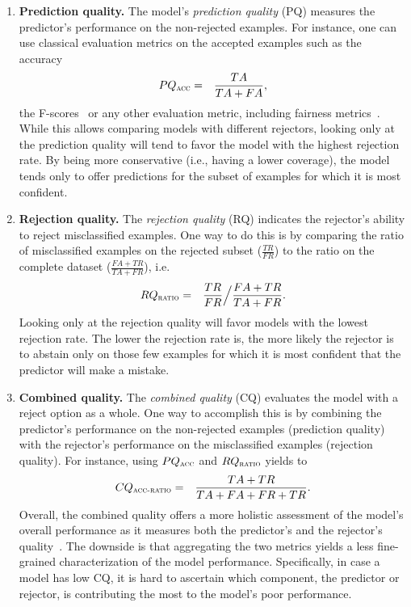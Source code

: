 \begin{enumerate}
%
\item[\textbf{a)}] \textbf{Prediction quality.} The model's \textit{prediction quality} (PQ) measures the predictor's performance on the non-rejected examples. For instance, one can use classical evaluation metrics on the accepted examples such as the accuracy
\begin{eqnarray*}
   PQ_{\textsc{acc}}&=& \frac{TA}{TA+FA},
\end{eqnarray*}
the F-scores~\citep{Pillai2011,Mesquita2016} or any other evaluation metric, including fairness metrics~\citep{Madras2018}.
While this allows comparing models with different rejectors, looking only at the prediction quality will tend to  favor the model with the highest rejection rate. By being more conservative (i.e., having a lower coverage), the model tends only to offer predictions for the subset of examples for which it is most confident. 
%
\item[\textbf{b)}] \textbf{Rejection quality.} The \textit{rejection quality} (RQ) indicates the rejector's ability to reject misclassified examples. 
One way to do this is by comparing the ratio of misclassified examples on the rejected subset ($\frac{TR}{FR}$) to the ratio on the complete dataset ($\frac{FA+TR}{TA+FR}$), i.e. 
\begin{eqnarray*}
   RQ_{\textsc{ratio}} &=& \frac{TR}{FR} \Big/ \frac{FA+TR}{TA+FR}.
\end{eqnarray*}
Looking only at the rejection quality will favor models with the lowest rejection rate. The lower the rejection rate is, the more likely the rejector is to abstain only on those few examples for which it is most confident that the predictor will make a mistake. 
%
\item[\textbf{c)}] \textbf{Combined quality.} The \textit{combined quality} (CQ) evaluates the model with a reject option as a whole. 
One way to accomplish this is by combining the predictor's performance on the non-rejected examples (prediction quality) with the rejector's performance on the misclassified examples (rejection quality). For instance, using $PQ_{\textsc{acc}}$ and $RQ_{\textsc{ratio}}$ yields to 
\begin{eqnarray*}
   CQ_{\textsc{acc-ratio}} &=& \frac{TA + TR}{TA+FA+FR+TR}.
\end{eqnarray*}
Overall, the combined quality offers a more holistic assessment of the model's overall performance as it measures both the predictor's and the rejector's quality~\citep{Lin2018}.
The downside is that aggregating the two metrics yields a less fine-grained characterization of the model performance. Specifically, in case a model has low CQ, it is hard to ascertain which component, the predictor or rejector, is contributing the most to the model's poor performance.
\end{enumerate}

